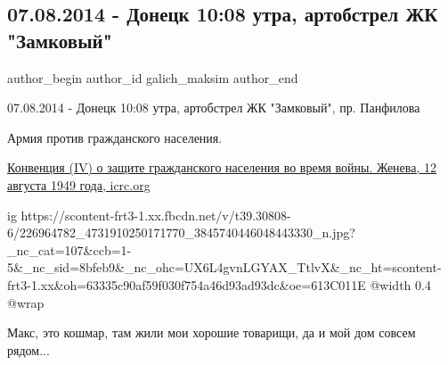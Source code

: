  
 
 
 
 
 
\subsection{07.08.2014 - Донецк 10:08 утра, артобстрел ЖК "Замковый"}
\label{sec:07_08_2021.fb.galich_maksim.1.doneck_zhk_zamkovyj_obstrel_07_08_2014}
 
\ifcmt
 author_begin
   author_id galich_maksim
 author_end
\fi

07.08.2014 - Донецк 10:08 утра, артобстрел ЖК "Замковый",  пр. Панфилова

Армия против гражданского населения. 

\href{https://www.icrc.org/ru/doc/resources/documents/misc/geneva-convention-4.htm}{%
Конвенция (IV) о защите гражданского населения во время войны. Женева, 12 августа 1949 года, icrc.org%
}

\ifcmt
  ig https://scontent-frt3-1.xx.fbcdn.net/v/t39.30808-6/226964782_4731910250171770_3845740446048443330_n.jpg?_nc_cat=107&ccb=1-5&_nc_sid=8bfeb9&_nc_ohc=UX6L4gvnLGYAX_TtlvX&_nc_ht=scontent-frt3-1.xx&oh=63335c90af59f030f754a46d93ad93dc&oe=613C011E
  @width 0.4
	@wrap \parpic[r]
\fi

 
Макс, это кошмар, там жили мои хорошие товарищи, да и мой дом совсем рядом...

 
